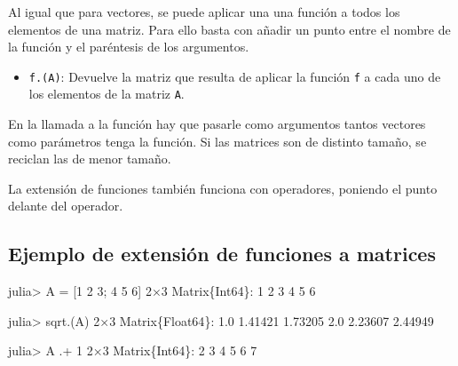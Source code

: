 \documentclass[
  letterpaper,
  DIV=11,
  numbers=noendperiod]{scrreprt}
\newenvironment{Shaded}{\begin{snugshade}}{\end{snugshade}}
\newcommand{\DataTypeTok}[1]{\textcolor[rgb]{0.68,0.00,0.00}{#1}}
\newcommand{\FloatTok}[1]{\textcolor[rgb]{0.68,0.00,0.00}{#1}}
\newcommand{\FunctionTok}[1]{\textcolor[rgb]{0.28,0.35,0.67}{#1}}
\newcommand{\NormalTok}[1]{\textcolor[rgb]{0.00,0.23,0.31}{#1}}
\newcommand{\OperatorTok}[1]{\textcolor[rgb]{0.37,0.37,0.37}{#1}}
\providecommand{\tightlist}{%
  \setlength{\itemsep}{0pt}\setlength{\parskip}{0pt}}\usepackage{longtable,booktabs,array}
\begin{document}
Al igual que para vectores, se puede aplicar una una función a todos los
elementos de una matriz. Para ello basta con añadir un punto entre el
nombre de la función y el paréntesis de los argumentos.

\begin{itemize}
\tightlist
\item
  \texttt{f.(A)}: Devuelve la matriz que resulta de aplicar la función
  \texttt{f} a cada uno de los elementos de la matriz \texttt{A}.
\end{itemize}

\begin{tcolorbox}[enhanced jigsaw, colbacktitle=quarto-callout-warning-color!10!white, coltitle=black, opacityback=0, opacitybacktitle=0.6, bottomtitle=1mm, leftrule=.75mm, toprule=.15mm, bottomrule=.15mm, toptitle=1mm, breakable, colframe=quarto-callout-warning-color-frame, colback=white, rightrule=.15mm, titlerule=0mm, title=\textcolor{quarto-callout-warning-color}{\faExclamationTriangle}\hspace{0.5em}{Warning}, arc=.35mm, left=2mm]
En la llamada a la función hay que pasarle como argumentos tantos
vectores como parámetros tenga la función. Si las matrices son de
distinto tamaño, se reciclan las de menor tamaño.
\end{tcolorbox}

La extensión de funciones también funciona con operadores, poniendo el
punto delante del operador.

\hypertarget{ejemplo-de-extensiuxf3n-de-funciones-a-matrices}{%
\subsection{Ejemplo de extensión de funciones a
matrices}\label{ejemplo-de-extensiuxf3n-de-funciones-a-matrices}}

\begin{Shaded}
\begin{Highlighting}[]
\NormalTok{julia}\OperatorTok{\textgreater{}}\NormalTok{ A }\OperatorTok{=}\NormalTok{ [}\FloatTok{1} \FloatTok{2} \FloatTok{3}\NormalTok{; }\FloatTok{4} \FloatTok{5} \FloatTok{6}\NormalTok{]}
\FloatTok{2}\OperatorTok{×}\FloatTok{3} \DataTypeTok{Matrix}\NormalTok{\{}\DataTypeTok{Int64}\NormalTok{\}}\OperatorTok{:}
 \FloatTok{1}  \FloatTok{2}  \FloatTok{3}
 \FloatTok{4}  \FloatTok{5}  \FloatTok{6}

\NormalTok{julia}\OperatorTok{\textgreater{}} \FunctionTok{sqrt}\NormalTok{.(A)}
\FloatTok{2}\OperatorTok{×}\FloatTok{3} \DataTypeTok{Matrix}\NormalTok{\{}\DataTypeTok{Float64}\NormalTok{\}}\OperatorTok{:}
 \FloatTok{1.0}  \FloatTok{1.41421}  \FloatTok{1.73205}
 \FloatTok{2.0}  \FloatTok{2.23607}  \FloatTok{2.44949}

\NormalTok{julia}\OperatorTok{\textgreater{}}\NormalTok{ A }\OperatorTok{.+} \FloatTok{1}
\FloatTok{2}\OperatorTok{×}\FloatTok{3} \DataTypeTok{Matrix}\NormalTok{\{}\DataTypeTok{Int64}\NormalTok{\}}\OperatorTok{:}
 \FloatTok{2}  \FloatTok{3}  \FloatTok{4}
 \FloatTok{5}  \FloatTok{6}  \FloatTok{7}
\end{Highlighting}
\end{Shaded}
\end{document}

